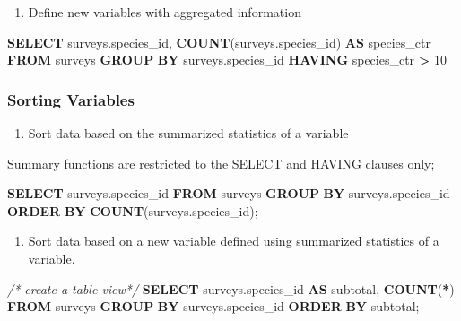 \documentclass[
]{book}
\newenvironment{Shaded}{\begin{snugshade}}{\end{snugshade}}
\newcommand{\CommentTok}[1]{\textcolor[rgb]{0.56,0.35,0.01}{\textit{#1}}}
\newcommand{\DecValTok}[1]{\textcolor[rgb]{0.00,0.00,0.81}{#1}}
\newcommand{\FunctionTok}[1]{\textcolor[rgb]{0.13,0.29,0.53}{\textbf{#1}}}
\newcommand{\KeywordTok}[1]{\textcolor[rgb]{0.13,0.29,0.53}{\textbf{#1}}}
\newcommand{\NormalTok}[1]{#1}
\newcommand{\OperatorTok}[1]{\textcolor[rgb]{0.81,0.36,0.00}{\textbf{#1}}}
\providecommand{\tightlist}{%
  \setlength{\itemsep}{0pt}\setlength{\parskip}{0pt}}
\begin{document}
\begin{enumerate}
\def\labelenumi{\arabic{enumi}.}
\setcounter{enumi}{2}
\tightlist
\item
  Define new variables with aggregated information
\end{enumerate}

\begin{Shaded}
\begin{Highlighting}[]
\KeywordTok{SELECT}\NormalTok{ surveys.species\_id, }
       \FunctionTok{COUNT}\NormalTok{(surveys.species\_id) }\KeywordTok{AS}\NormalTok{ species\_ctr}
\KeywordTok{FROM}\NormalTok{ surveys}
\KeywordTok{GROUP} \KeywordTok{BY}\NormalTok{ surveys.species\_id}
\KeywordTok{HAVING}\NormalTok{ species\_ctr }\OperatorTok{\textgreater{}} \DecValTok{10}
\end{Highlighting}
\end{Shaded}

\hypertarget{sorting-variables-1}{%
\subsubsection{Sorting Variables}\label{sorting-variables-1}}

\begin{enumerate}
\def\labelenumi{\arabic{enumi}.}
\tightlist
\item
  Sort data based on the summarized statistics of a variable
\end{enumerate}

Summary functions are restricted to the SELECT and HAVING clauses only;

\begin{Shaded}
\begin{Highlighting}[]
\KeywordTok{SELECT}\NormalTok{ surveys.species\_id}
\KeywordTok{FROM}\NormalTok{ surveys}
\KeywordTok{GROUP} \KeywordTok{BY}\NormalTok{ surveys.species\_id}
\KeywordTok{ORDER} \KeywordTok{BY} \FunctionTok{COUNT}\NormalTok{(surveys.species\_id);}
\end{Highlighting}
\end{Shaded}

\begin{enumerate}
\def\labelenumi{\arabic{enumi}.}
\setcounter{enumi}{1}
\tightlist
\item
  Sort data based on a new variable defined using summarized statistics of a variable.
\end{enumerate}

\begin{Shaded}
\begin{Highlighting}[]
\CommentTok{/* create a table view*/}
\KeywordTok{SELECT}\NormalTok{ surveys.species\_id }\KeywordTok{AS}\NormalTok{ subtotal, }
       \FunctionTok{COUNT}\NormalTok{(}\OperatorTok{*}\NormalTok{) }
\KeywordTok{FROM}\NormalTok{ surveys}
\KeywordTok{GROUP} \KeywordTok{BY}\NormalTok{ surveys.species\_id}
\KeywordTok{ORDER} \KeywordTok{BY}\NormalTok{ subtotal;}
\end{Highlighting}
\end{Shaded}
\end{document}
